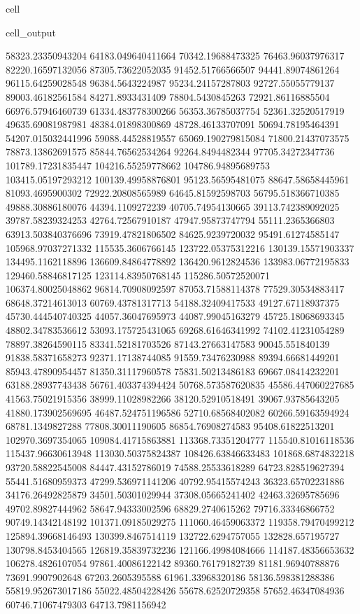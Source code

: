 \documentclass[letterpaper,10pt,english]{jupyterBook}
\begin{document}
\begin{sphinxuseclass}{cell}
\begin{sphinxVerbatimOutput}
\begin{sphinxuseclass}{cell_output}
\begin{sphinxVerbatim}[commandchars=\\\{\}]
58323.23350943204  64183.049640411664  70342.19688473325  76463.96037976317  82220.16597132056  87305.73622052035  91452.51766566507  94441.89074861264  96115.64259028548  96384.5643224987  95234.24157287803  92727.55055779137  89003.46182561584  84271.8933431409  78804.5430845263  72921.86116885504  66976.57946460739  61334.483778300266  56353.36785037754  52361.32520517919  49635.69081987981  48384.01898300869  48728.46133707091  50694.78195464391  54207.015032441996  59088.44528819557  65069.190279815084  71800.21437073575  78873.13862691575  85844.76562534264  92264.8494482344  97705.34272347736  101789.17231835447  104216.55259778662  104786.94895689753  103415.05197293212  100139.49958876801  95123.56595481075  88647.58658445961  81093.4695900302  72922.20808565989  64645.81592598703  56795.518366710385  49888.30886180076  44394.1109272239  40705.74954130665  39113.742389092025  39787.58239324253  42764.72567910187  47947.95873747794  55111.2365366803  63913.503840376696  73919.47821806502  84625.9239720032  95491.61274585147  105968.97037271332  115535.3606766145  123722.05375312216  130139.15571903337  134495.1162118896  136609.84864778892  136420.9612824536  133983.06772195833  129460.58846817125  123114.83950768145  115286.50572520071  106374.80025048862  96814.70908092597  87053.71588114378  77529.30534883417  68648.37214613013  60769.43781317713  54188.32409417533  49127.67118937375  45730.444540740325  44057.36047695973  44087.99045163279  45725.18068693345  48802.34783536612  53093.175725431065  
69268.61646341992  74102.41231054289  78897.38264590115  83341.52181703526  87143.27663147583  90045.551840139  91838.58371658273  92371.17138744085  91559.73476230988  89394.66681449201  85943.47890954457  81350.31117960578  75831.50213486183  69667.08414232201  63188.28937743438  56761.403374394424  50768.573587620835  45586.447060227685  41563.75021915356  38999.11028982266  38120.52910518491  39067.93785643205  41880.173902569695  46487.524751196586  52710.68568402082  60266.59163594924  68781.1349827288  77808.30011190605  86854.76908274583  95408.61822513201  102970.3697354065  109084.41715863881  113368.73351204777  115540.81016118536  115437.96630613948  113030.50375824387  108426.63846633483  101868.6874832218  93720.58822545008  84447.43152786019  74588.25533618289  64723.828519627394  55441.51680959373  47299.536971141206  40792.95415574243  36323.65702231886  34176.26492825879  34501.50301029944  37308.05665241402  42463.32695785696  49702.89827444962  58647.94333002596  68829.2740615262  79716.33346866752  90749.14342148192  101371.09185029275  111060.46459063372  119358.79470499212  125894.39668146493  130399.8467514119  132722.6294757055  132828.657195727  130798.8453404565  126819.35839732236  121166.49984084666  114187.48356653632  106278.4826107054  97861.40086122142  89360.76179182739  81181.96940788876  73691.9907902648  67203.2605395588  61961.33968320186  58136.598381288386  55819.952673017186  55022.48504228426  55678.62520729358  57652.46347084936  60746.71067479303  64713.7981156942  

\end{sphinxVerbatim}
\end{sphinxuseclass}
\end{sphinxVerbatimOutput}
\end{sphinxuseclass}
\end{document}
